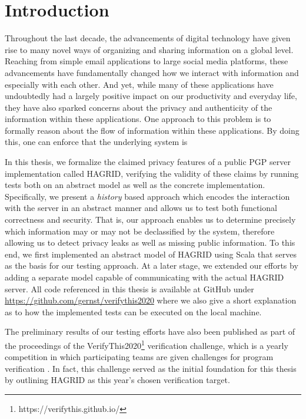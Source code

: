 
\section{Introduction}
Throughout the last decade, the advancements of digital technology have given rise to many novel ways of organizing and sharing information on a global level.
Reaching from simple email applications to large social media platforms, these advancements have fundamentally changed how we interact with information and especially with each other.
And yet, while many of these applications have undoubtedly had a largely positive impact on our productivity and everyday life, they have also sparked concerns about the privacy and authenticity of the information within these applications. 
One approach to this problem is to formally reason about the flow of information within these applications. By doing this, one can enforce that the underlying system is  

In this thesis, we formalize the claimed privacy features of a public PGP server implementation called HAGRID, verifying the validity of these claims by running tests both on an abstract model as well as the concrete implementation. Specifically, we present a \emph{history} based approach which encodes the interaction with the server in an abstract manner and allows us to test both functional correctness and security. That is, our approach enables us to determine precisely which information may or may not be declassified by the system, therefore allowing us to detect privacy leaks as well as missing public information. To this end, we first implemented an abstract model of HAGRID using Scala that serves as the basis for our testing approach. At a later stage, we extended our efforts by adding a separate model capable of communicating with the actual HAGRID server. All code referenced in this thesis is available at GitHub under \url{https://github.com/gernst/verifythis2020} where we also give a short explanation as to how the implemented tests can be executed on the local machine.

The preliminary results of our testing efforts have also been published as part of the proceedings of the VerifyThis2020\footnote{https://verifythis.github.io/} verification challenge, which is a yearly competition in which participating teams are given challenges for program verification \cite{VTLTC2020/IFTesting}. In fact, this challenge served as the initial foundation for this thesis by outlining HAGRID as this year's chosen verification target.

